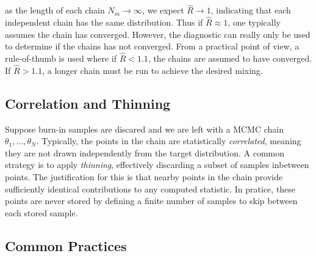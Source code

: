 as the length of each chain $N_m \to \infty$, we expect $\hat{R} \to 1$, indicating that each independent chain has the same distribution.
Thus if $\hat{R} \approx 1$, one typically assumes the chain has converged. However, the diagnostic can really only be used to determine if the chains has not converged. From a practical point of view, a rule-of-thumb is used where if $\hat{R} < 1.1$, the chains are assumed to have converged. If $\hat{R} > 1.1$, a longer chain must be run to achieve the desired mixing.

\subsection{Correlation and Thinning}
Suppose burn-in samples are discared and we are left with a MCMC chain $\theta_1, \ldots, \theta_N$. Typically, the points in the chain are statistically \textit{correlated}, meaning they are not drawn independently from the target distribution. A common strategy
is to apply \textit{thinning}, effectively discarding a subset of samples inbetween points. The justification for this is
that nearby points in the chain provide sufficiently identical contributions to any computed statistic. In pratice, these points 
are never stored by defining a finite number of samples to skip between each stored sample.

\subsection{Common Practices}


